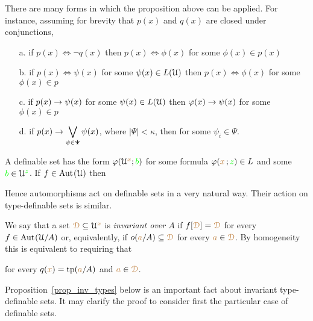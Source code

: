 \begin{remark}\label{rem_normality}There are many forms in which the proposition above can be applied. For instance, assuming for brevity that $p(x)$ and $q(x)$ are closed under conjunctions,
\begin{itemize}
\item[a.] if $p(x)\iff\neg q(x)$ then $p(x)\iff\phi(x)$ for some $\phi(x)\in p(x)$\smallskip
\item[b.] if $\displaystyle p(x)\iff\psi(x)$ for some $\psi(x)\in L(\EuScript U)$ then $p(x)\iff\phi(x)$ for some $\phi(x)\in p$\smallskip
\item[c.] if $\displaystyle p(x)\rightarrow\psi(x)$ for some $\psi(x)\in L(\EuScript U)$ then $\varphi(x)\rightarrow\psi(x)$ for some $\phi(x)\in p$\smallskip
\item[d.] if $\displaystyle p(x)\rightarrow\bigvee_{\psi\in\Psi}\psi(x)$, where $|\Psi|<\kappa$,  then  for some $\psi_i\in\Psi$.
\end{itemize}
\end{remark}

\begin{remark}\label{rem_image_def_set}
  A definable set has the form $\varphi(\EuScript U^{\color{brown} x};{\color{green} b})$ for some formula $\varphi({\color{brown} x}\,;{\color{green} z})\in L$ and some ${\color{green} b}\in\EuScript U^{\color{green} z}$.
  If $f\in{\rm Aut\kern.15ex}(\EuScript U)$ then 




  Hence automorphisms act on definable sets in a very natural way. 
  Their action on type-definable sets is similar.
\end{remark}

We say that a set ${\color{brown}\EuScript D}\subseteq\EuScript U^{{\color{brown} x}}$ is \emph{invariant over $A$\/} if $f[{\color{brown}\EuScript D}]={\color{brown}\EuScript D}$ for every $f\in{\rm Aut\kern.15ex}(\EuScript U/A)$ or, equivalently, if $o({\color{brown} a}/A)\subseteq {\color{brown}\EuScript D}$ for every ${\color{brown} a}\in {\color{brown}\EuScript D}$.
By homogeneity this is equivalent to requiring that 


for every $q({\color{brown} x})={\rm tp}({\color{brown} a}/A)$ and ${\color{brown} a}\in {\color{brown}\EuScript D}$.

Proposition~\ref{prop_inv_types} below is an important fact about invariant type-definable sets.
It may clarify the proof to consider first the particular case of definable sets.

